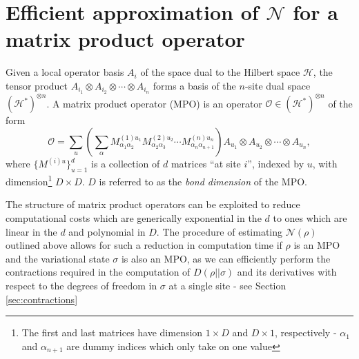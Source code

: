 \documentclass{article}
\begin{document}
\section{Efficient approximation of $\mathcal N$ for a matrix product operator}

Given a local operator basis $A_i$ of the space dual to the Hilbert space $\mathcal H$, the tensor product $A_{i_1}\otimes A_{i_2}\otimes\cdots\otimes A_{i_n}$ forms a basis of the $n$-site dual space $(\mathcal H^*)^{\otimes n}$. A matrix product operator (MPO) is an operator $\mathcal O\in (\mathcal H^*)^{\otimes n}$ of the form
\begin{equation}\mathcal O=\sum_u\left(\sum_{\alpha}M_{\alpha_1\alpha_2}^{(1)u_1}M_{\alpha_2\alpha_3}^{(2)u_2}\cdots M_{\alpha_n\alpha_{n+1}}^{(n)u_n}\right)A_{u_1}\otimes A_{u_2}\otimes\cdots\otimes A_{u_n},\end{equation}
where $\{M^{(i)u}\}_{u=1}^d$ is a collection of $d$ matrices ``at site $i$'', indexed by $u$, with dimension\footnote{The first and last matrices have dimension $1\times D$ and $D\times 1$, respectively - $\alpha_1$ and $\alpha_{n+1}$ are dummy indices which only take on one value} $D\times D$. $D$ is referred to as the \textit{bond dimension} of the MPO.

% 

The structure of matrix product operators can be exploited to reduce computational costs which are generically exponential in the $d$ to ones which are linear in the $d$ and polynomial in $D$. The procedure of estimating $\mathcal N(\rho)$ outlined above allows for such a reduction in computation time if $\rho$ is an MPO and the variational state $\sigma$ is also an MPO, as we can efficiently perform the contractions required in the computation of $D(\rho||\sigma)$ and its derivatives with respect to the degrees of freedom in $\sigma$ at a single site - see Section \ref{sec:contractions}
\end{document}
